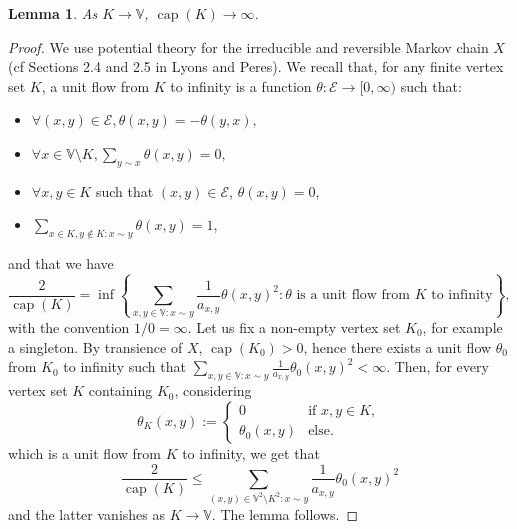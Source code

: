 \documentclass[12pt,a4paper]{article}
\newtheorem{lemma}[theo]{Lemma}
\newcommand{\1}[1]{{\mathbf 1}{\{#1\}}}
\newcommand{\8}{{\infty}}
\newcommand{\capa}{\mathop{\mathrm{cap}}}
\begin{document}
\begin{lemma}\label{lem:cap_to_infty}
  As $K\to\mathbb{V}$, $\capa(K)\to \infty$. 
\end{lemma}
\begin{proof}
  We use potential theory for the irreducible and reversible Markov chain $X$ (cf Sections 2.4 and 2.5 in Lyons and Peres). %
  We recall that, for any finite vertex set $K$, a unit flow from $K$ to infinity is a function $\theta:\mathcal{E} \to [0, \infty)$ such that:
  \begin{itemize}
  \item $\forall (x,y)\in \mathcal{E}, \theta(x,y)=-\theta(y,x),$
  \item $\forall x \in \mathbb{V}\setminus K, \sum_{y\sim x } \theta(x,y)=0,$
  \item $\forall x, y \in K$ such that $(x,y)\in \mathcal{E}$, $\theta(x,y)=0$,
  \item $ \sum_{x\in K, y\notin K: x\sim y} \theta(x,y)=1$,
  \end{itemize}
  and that we have
  \begin{equation}
    \frac{2}{\capa(K)} = 
    \inf \left\{
      \sum_{x,y\in \mathbb{V}: x\sim y} \frac{1}{a_{x,y}} \theta(x,y)^2 : 
    \theta \text{ is a unit flow from } K \text{ to infinity}
    \right\}, 
  \end{equation}
  with the convention $1/0=\infty$. %
  Let us fix a non-empty vertex set $K_0$, for example a singleton. By transience of $X$, $\capa(K_0)>0$, hence there exists a unit flow $\theta_0$ from $K_0$ to infinity such that $\sum_{x,y\in \mathbb{V}: x\sim y} \frac{1}{a_{x,y}} \theta_0(x,y)^2<\infty$. %
  Then, for every vertex set $K$ containing $K_0$, considering
  \begin{equation}
  \theta_K(x,y):= 
    \begin{cases}
      0 & \text{if } x, y \in K, \\
      \theta_0(x,y)  & \text{else}.
    \end{cases}
  \end{equation}
  which is a unit flow from $K$ to infinity, we get that 
  \begin{equation}
    \frac{2}{\capa(K)}  \le \sum_{(x,y) \in \mathbb{V}^2 \setminus K^2 : x\sim y} \frac{1}{a_{x,y}} \theta_0(x,y)^2
  \end{equation}
  and the latter vanishes as $K\to\mathbb{V}$. The lemma follows.
\end{proof}
\end{document}
